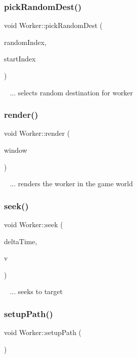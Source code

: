 \subsubsection{\texorpdfstring{pick\+Random\+Dest()}{pickRandomDest()}}
{\footnotesize\ttfamily void Worker\+::pick\+Random\+Dest (\begin{DoxyParamCaption}\item[{int}]{random\+Index,  }\item[{int}]{start\+Index }\end{DoxyParamCaption})}

~\newline
... selects random destination for worker\mbox{\label{class_worker_a18940af5e921feefc2373e120d66ff24}} 
\subsubsection{\texorpdfstring{render()}{render()}}
{\footnotesize\ttfamily void Worker\+::render (\begin{DoxyParamCaption}\item[{sf\+::\+Render\+Window \&}]{window }\end{DoxyParamCaption})}

~\newline
... renders the worker in the game world\mbox{\label{class_worker_a5d3aefa5dd3ad224ac861b4d69db95ed}} 
\subsubsection{\texorpdfstring{seek()}{seek()}}
{\footnotesize\ttfamily void Worker\+::seek (\begin{DoxyParamCaption}\item[{float}]{delta\+Time,  }\item[{sf\+::\+Vector2f}]{v }\end{DoxyParamCaption})}

~\newline
... seeks to target\mbox{\label{class_worker_a1d02fa53eec27493717027977ffb6c54}} 
\subsubsection{\texorpdfstring{setup\+Path()}{setupPath()}}
{\footnotesize\ttfamily void Worker\+::setup\+Path (\begin{DoxyParamCaption}{ }\end{DoxyParamCaption})}


